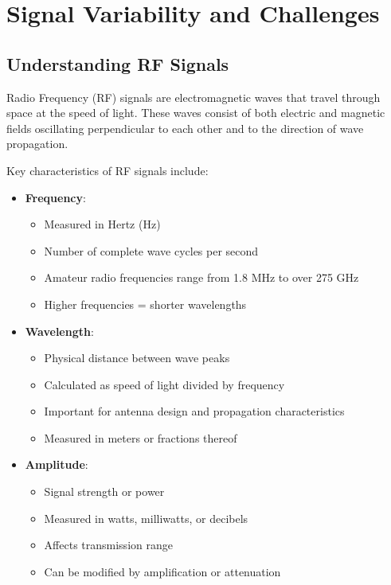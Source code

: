 \section{Signal Variability and Challenges}
\label{section:signal_variability}

\subsection*{Understanding RF Signals}
Radio Frequency (RF) signals are electromagnetic waves that travel through space at the speed of light. These waves consist of both electric and magnetic fields oscillating perpendicular to each other and to the direction of wave propagation.

Key characteristics of RF signals include:

\begin{itemize}
    \item \textbf{Frequency}: 
        \begin{itemize}
            \item Measured in Hertz (Hz)
            \item Number of complete wave cycles per second
            \item Amateur radio frequencies range from 1.8 MHz to over 275 GHz
            \item Higher frequencies = shorter wavelengths
        \end{itemize}
    
    \item \textbf{Wavelength}:
        \begin{itemize}
            \item Physical distance between wave peaks
            \item Calculated as speed of light divided by frequency
            \item Important for antenna design and propagation characteristics
            \item Measured in meters or fractions thereof
        \end{itemize}
    
    \item \textbf{Amplitude}:
        \begin{itemize}
            \item Signal strength or power
            \item Measured in watts, milliwatts, or decibels
            \item Affects transmission range
            \item Can be modified by amplification or attenuation
        \end{itemize}
\end{itemize}

